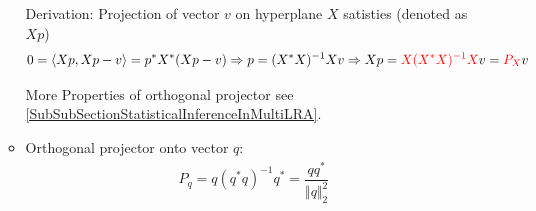 \begin{itemize}[topsep=2pt,itemsep=0pt]
\begin{itemize}
        Derivation: Projection of vector $ v $ on hyperplane $ X $ satisties (denoted as $ Xp $)
        \begin{align}
            0=\langle Xp,Xp-v\rangle=p^*X^*(Xp-v)\Rightarrow p=(X^*X)^{-1}Xv\Rightarrow Xp={\color{red}X(X^*X)^{-1}X}v={\color{red}P_X}v
        \end{align}
        
        More Properties of orthogonal projector see \autoref{SubSubSectionStatisticalInferenceInMultiLRA}.
        \item Orthogonal projector onto vector $ q $:
        \begin{align}
            P_q=q(q^*q)^{-1}q^*=\dfrac{qq^*}{\Vert q \Vert^2_2 } 
        \end{align}
        
        
    \end{itemize}



\end{itemize}

    
    
        
        
        
